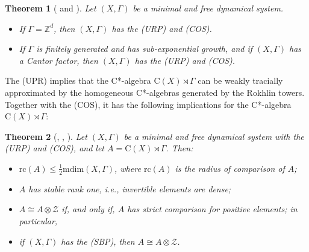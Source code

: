 \documentclass[12pt, oneside, psamsfonts]{amsart}
\newtheorem{thm}{Theorem}[section]
\theoremstyle{definition}
\theoremstyle{remark}
\numberwithin{equation}{section}
\newcommand{\Int}{\mathbb Z}
\begin{document}
\begin{thm}[\cite{Niu-MD-Z} and \cite{Niu-MD-Zd}]
Let $(X, \Gamma)$ be a minimal and free dynamical system.
\begin{itemize}
\item If $\Gamma = \Int^d$, then $(X, \Gamma)$ has the (URP) and (COS).
\item If $\Gamma$ is finitely generated and has sub-exponential growth, and if $(X, \Gamma)$ has a Cantor factor, then $(X, \Gamma)$ has the (URP) and (COS).
\end{itemize}
\end{thm}

The (UPR) implies that the C*-algebra $\mathrm{C}(X)\rtimes\Gamma$ can be weakly tracially approximated by the homogeneous C*-algebras generated by the Rokhlin towers. Together with the (COS), it has the following implications for the C*-algebra $\mathrm{C}(X) \rtimes \Gamma$:
\begin{thm}[\cite{Niu-MD-Z}, \cite{Niu-MD-Z-absorbing}, \cite{LN-sr1}]
Let $(X, \Gamma)$ be a minimal and free dynamical system with the (URP) and (COS), and let $A = \mathrm{C}(X) \rtimes\Gamma$. Then:
\begin{itemize}
\item $\mathrm{rc}(A) \leq \frac{1}{2} \mathrm{mdim}(X, \Gamma)$, where $\mathrm{rc}(A)$ is the radius of comparison of $A$; 
\item $A$ has stable rank one, i.e., invertible elements are dense;
\item $A \cong A\otimes\mathcal Z$ if, and only if, $A$ has strict comparison for positive elements; in particular,
\item if $(X, \Gamma)$ has the (SBP), then $A \cong A\otimes\mathcal Z$.
\end{itemize}

\end{thm}
\end{document}
